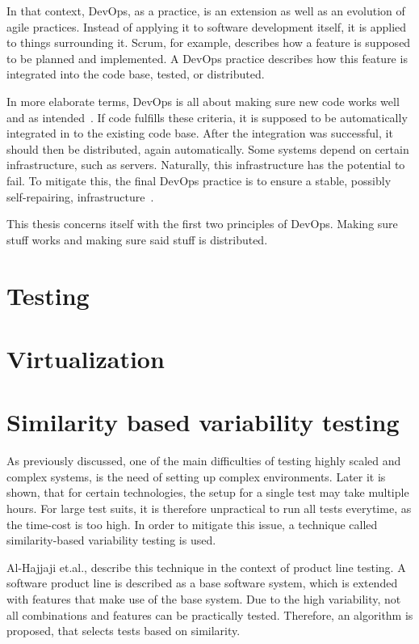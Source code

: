 In that context, DevOps, as a practice, is an extension as well as an evolution of agile practices.
Instead of applying it to software development itself, it is applied to things surrounding it.
Scrum, for example, describes how a feature is supposed to be planned and implemented.
A DevOps practice describes how this feature is integrated into the code base, tested, or distributed.

In more elaborate terms, DevOps is all about making sure new code works well and as intended~\cite{the-software-architext-and-devops}.
If code fulfills these criteria, it is supposed to be automatically integrated in to the existing code base.
After the integration was successful, it should then be distributed, again automatically.
Some systems depend on certain infrastructure, such as servers.
Naturally, this infrastructure has the potential to fail.
To mitigate this, the final DevOps practice is to ensure a stable, possibly self-repairing, infrastructure~\cite{container-and-microservice-driven-design-for-cloud-infrastructure-devops}.

This thesis concerns itself with the first two principles of DevOps.
Making sure stuff works and making sure said stuff is distributed.


\section{Testing}\label{sec:testing}

\section{Virtualization}\label{sec:virtualization}



\section{Similarity based variability testing}\label{sec:similarities}
As previously discussed, one of the main difficulties of testing highly scaled and complex systems, is the need of setting up complex environments.
Later it is shown, that for certain technologies, the setup for a single test may take multiple hours.
For large test suits, it is therefore unpractical to run all tests everytime, as the time-cost is too high.
In order to mitigate this issue, a technique called similarity-based variability testing is used.

Al-Hajjaji et.al., describe this technique in the context of product line testing\cite{SimilarityBasedPrioritizationInSoftwareProductLineTesting}.
A software product line is described as a base software system, which is extended with features that make use of the base system.
Due to the high variability, not all combinations and features can be practically tested.
Therefore, an algorithm is proposed, that selects tests based on similarity.

